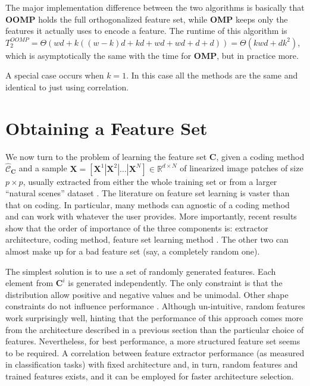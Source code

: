 \documentclass[12pt,a4paper,oneside,english]{UPBThesis}
\newcommand{\hctimes}[2]{{#1}\!\times\!{#2}}
\begin{document}
The major implementation difference between the two algorithms is basically that \textbf{OOMP} holds the full orthogonalized feature set, while \textbf{OMP} keeps only the features it actually uses to encode a feature. The runtime of this algorithm is $T_2^{OOMP} = \Theta(wd + k((w-k)d + kd + wd + wd + d + d)) = \Theta(kwd + dk^2)$, which is asymptotically the same with the time for \textbf{OMP}, but in practice more.

A special case occurs when $k=1$. In this case all the methods are the same and identical to just using correlation.

\chapter{Obtaining a Feature Set}
\label{chap:ObtainingFeatureSet}

We now turn to the problem of learning the feature set $\textbf{C}$, given a coding method $\hat{\mathcal{C}}_\textbf{C}$ and a sample $\textbf{X} = \left[ \textbf{X}^1 \left|\right. \textbf{X}^2 \left|\right. \dots \left|\right. \textbf{X}^N \right] \in \mathbb{R}^{\hctimes{d}{N}}$ of linearized image patches of size $\hctimes{p}{p}$, usually extracted from either the whole training set or from a larger ``natural scenes'' dataset \cite{self-taught-learning}. The literature on feature set learning is vaster than that on coding. In particular, many methods can agnostic of a coding method and can work with whatever the user provides. More importantly, recent results show that the order of importance of the three components is: extractor architecture, coding method, feature set learning method \cite{importance-encoding-sparse-coding-vq,random-weights-feature-learning,beyond-simple-features}. The other two can almost make up for a bad feature set (say, a completely random one).

The simplest solution is to use a set of randomly generated features. Each element from $\textbf{C}^i$ is generated independently. The only constraint is that the distribution allow positive and negative values and be unimodal. Other shape constraints do not influence performance \cite{random-weights-feature-learning}. Although un-intuitive, random features work surprisingly well, hinting that the performance of this approach comes more from the architecture described in a previous section than the particular choice of features. Nevertheless, for best performance, a more structured feature set seems to be required. A correlation between feature extractor performance (as measured in classification tasks) with fixed architecture and, in turn, random features and trained features exists, and it can be employed for faster architecture selection.
\end{document}
